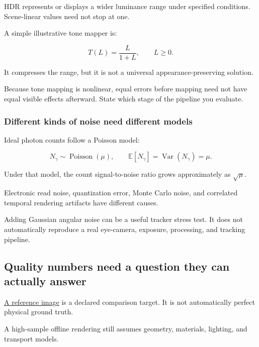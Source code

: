 HDR represents or displays a wider luminance range under specified conditions. Scene-linear values need not stop at one.

A simple illustrative tone mapper is:

\[
T(L)=\frac{L}{1+L},
\qquad L\geq0.
\]

It compresses the range, but it is not a universal appearance-preserving solution.

Because tone mapping is nonlinear, equal errors before mapping need not have equal visible effects afterward. State which stage of the pipeline you evaluate.

\subsubsection{Different kinds of noise need different models}\label{04-visual-computing-ii-ch043-different-kinds-of-noise-need-different-models}

\hypertarget{04-visual-computing-ii-ch043-different-kinds-of-noise-need-different-models}{}

Ideal photon counts follow a Poisson model:

\[
N_\gamma\sim\operatorname{Poisson}(\mu),
\qquad
\mathbb E[N_\gamma]=\operatorname{Var}(N_\gamma)=\mu.
\]

Under that model, the count signal-to-noise ratio grows approximately as \(\sqrt{\mu}\).

Electronic read noise, quantization error, Monte Carlo noise, and correlated temporal rendering artifacts have different causes.

Adding Gaussian angular noise can be a useful tracker stress test. It does not automatically reproduce a real eye-camera, exposure, processing, and tracking pipeline.

\subsection{Quality numbers need a question they can actually answer}\label{04-visual-computing-ii-ch043-quality-numbers-need-a-question-they-can-actually-answer}

\hypertarget{04-visual-computing-ii-ch043-quality-numbers-need-a-question-they-can-actually-answer}{}

\hyperref[appendix-b2c1846508bf]{A reference image} is a declared comparison target. It is not automatically perfect physical ground truth.

A high-sample offline rendering still assumes geometry, materials, lighting, and transport models.

